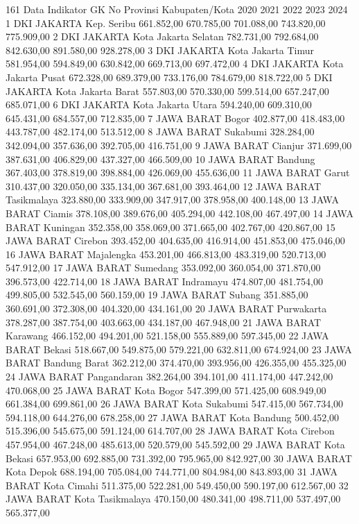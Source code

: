 161
Data Indikator GK
No Provinsi Kabupaten/Kota 2020 2021 2022 2023 2024
1 DKI JAKARTA Kep. Seribu 661.852,00 670.785,00 701.088,00 743.820,00 775.909,00
2 DKI JAKARTA Kota Jakarta Selatan 782.731,00 792.684,00 842.630,00 891.580,00 928.278,00
3 DKI JAKARTA Kota Jakarta Timur 581.954,00 594.849,00 630.842,00 669.713,00 697.472,00
4 DKI JAKARTA Kota Jakarta Pusat 672.328,00 689.379,00 733.176,00 784.679,00 818.722,00
5 DKI JAKARTA Kota Jakarta Barat 557.803,00 570.330,00 599.514,00 657.247,00 685.071,00
6 DKI JAKARTA Kota Jakarta Utara 594.240,00 609.310,00 645.431,00 684.557,00 712.835,00
7 JAWA BARAT Bogor 402.877,00 418.483,00 443.787,00 482.174,00 513.512,00
8 JAWA BARAT Sukabumi 328.284,00 342.094,00 357.636,00 392.705,00 416.751,00
9 JAWA BARAT Cianjur 371.699,00 387.631,00 406.829,00 437.327,00 466.509,00
10 JAWA BARAT Bandung 367.403,00 378.819,00 398.884,00 426.069,00 455.636,00
11 JAWA BARAT Garut 310.437,00 320.050,00 335.134,00 367.681,00 393.464,00
12 JAWA BARAT Tasikmalaya 323.880,00 333.909,00 347.917,00 378.958,00 400.148,00
13 JAWA BARAT Ciamis 378.108,00 389.676,00 405.294,00 442.108,00 467.497,00
14 JAWA BARAT Kuningan 352.358,00 358.069,00 371.665,00 402.767,00 420.867,00
15 JAWA BARAT Cirebon 393.452,00 404.635,00 416.914,00 451.853,00 475.046,00
16 JAWA BARAT Majalengka 453.201,00 466.813,00 483.319,00 520.713,00 547.912,00
17 JAWA BARAT Sumedang 353.092,00 360.054,00 371.870,00 396.573,00 422.714,00
18 JAWA BARAT Indramayu 474.807,00 481.754,00 499.805,00 532.545,00 560.159,00
19 JAWA BARAT Subang 351.885,00 360.691,00 372.308,00 404.320,00 434.161,00
20 JAWA BARAT Purwakarta 378.287,00 387.754,00 403.663,00 434.187,00 467.948,00
21 JAWA BARAT Karawang 466.152,00 494.201,00 521.158,00 555.889,00 597.345,00
22 JAWA BARAT Bekasi 518.667,00 549.875,00 579.221,00 632.811,00 674.924,00
23 JAWA BARAT Bandung Barat 362.212,00 374.470,00 393.956,00 426.355,00 455.325,00
24 JAWA BARAT Pangandaran 382.264,00 394.101,00 411.174,00 447.242,00 470.068,00
25 JAWA BARAT Kota Bogor 547.399,00 571.425,00 608.949,00 661.384,00 699.861,00
26 JAWA BARAT Kota Sukabumi 547.415,00 567.734,00 594.118,00 644.276,00 678.258,00
27 JAWA BARAT Kota Bandung 500.452,00 515.396,00 545.675,00 591.124,00 614.707,00
28 JAWA BARAT Kota Cirebon 457.954,00 467.248,00 485.613,00 520.579,00 545.592,00
29 JAWA BARAT Kota Bekasi 657.953,00 692.885,00 731.392,00 795.965,00 842.927,00
30 JAWA BARAT Kota Depok 688.194,00 705.084,00 744.771,00 804.984,00 843.893,00
31 JAWA BARAT Kota Cimahi 511.375,00 522.281,00 549.450,00 590.197,00 612.567,00
32 JAWA BARAT Kota Tasikmalaya 470.150,00 480.341,00 498.711,00 537.497,00 565.377,00
